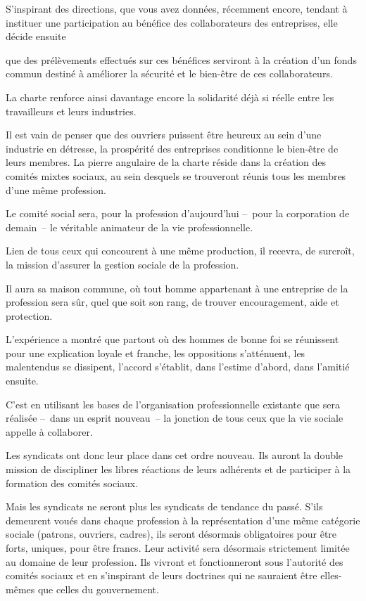 \documentclass[french,twoside]{book} %
\begin{document}
S’inspirant des directions, que vous avez données, récemment encore, tendant à instituer une participation au bénéfice des collaborateurs des entreprises, elle décide ensuite\par
que des prélèvements effectués sur ces bénéfices serviront à la création d’un fonds commun destiné à améliorer la sécurité et le bien-être de ces collaborateurs.\par
La charte renforce ainsi davantage encore la solidarité déjà si réelle entre les travailleurs et leurs industries.\par
Il est vain de penser que des ouvriers puissent être heureux au sein d’une industrie en détresse, la prospérité des entreprises conditionne le bien-être de leurs membres. La pierre angulaire de la charte réside dans la création des comités mixtes sociaux, au sein desquels se trouveront réunis tous les membres d’une même profession.\par
Le comité social sera, pour la profession d’aujourd’hui – pour la corporation de demain – le véritable animateur de la vie professionnelle.\par
Lien de tous ceux qui concourent à une même production, il recevra, de surcroît, la mission d’assurer la gestion sociale de la profession.\par
Il aura sa maison commune, où tout homme appartenant à une entreprise de la profession sera sûr, quel que soit son rang, de trouver encouragement, aide et protection.\par
L’expérience a montré que partout où des hommes de bonne foi se réunissent pour une explication loyale et franche, les oppositions s’atténuent, les malentendus se dissipent, l’accord s’établit, dans l’estime d’abord, dans l’amitié ensuite.\par
C’est en utilisant les bases de l’organisation professionnelle existante que sera réalisée – dans un esprit nouveau – la jonction de tous ceux que la vie sociale appelle à collaborer.\par
Les syndicats ont donc leur place dans cet ordre nouveau. Ils auront la double mission de discipliner les libres réactions de leurs adhérents et de participer à la formation des comités sociaux.\par
Mais les syndicats ne seront plus les syndicats de tendance du passé. S’ils demeurent voués dans chaque profession à la représentation d’une même catégorie sociale (patrons, ouvriers, cadres), ils seront désormais obligatoires pour être forts, uniques, pour être francs. Leur activité sera désormais strictement limitée au domaine de leur profession. Ils vivront et fonctionneront sous l’autorité des comités sociaux et en s’inspirant de leurs doctrines qui ne sauraient être elles-mêmes que celles du gouvernement.\par
\end{document}
